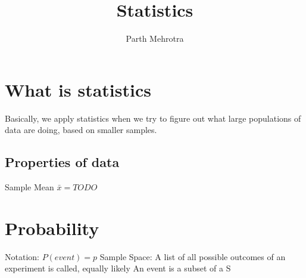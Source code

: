 \documentclass{article}
\title{Statistics}
\author{Parth Mehrotra}
\begin{document}
	\maketitle
	\newpage

	\section{What is statistics} 
		Basically, we apply statistics when we try to figure out what large populations of data are doing, based on smaller samples.
		\subsection{Properties of data}
			Sample Mean
			$\bar{x} = TODO $

	\section{Probability}
		Notation: 
		$P(event) = p$
		Sample Space: A list of all possible outcomes of an experiment is called, equally likely
		An event is a subset of a S
\end{document}
